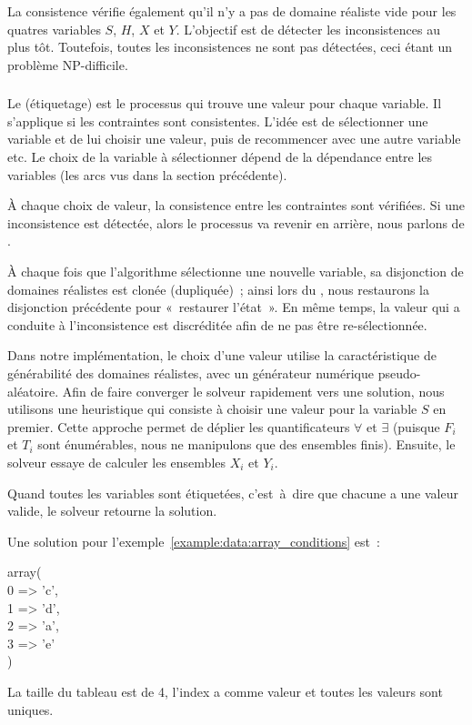 La consistence vérifie également qu'il n'y a pas de domaine réaliste vide pour
les quatres variables $S$, $H$, $X$ et $Y$. L'objectif est de détecter les
inconsistences au plus tôt. Toutefois, toutes les inconsistences ne sont pas
détectées, ceci étant un problème NP-difficile.

\subsubsection{}

Le  (étiquetage) est le processus qui trouve une valeur
pour chaque variable. Il s'applique si les contraintes sont consistentes. L'idée
est de sélectionner une variable et de lui choisir une valeur, puis de
recommencer avec une autre variable etc. Le choix de la variable à sélectionner
dépend de la dépendance entre les variables (les arcs vus dans la section
précédente).

À chaque choix de valeur, la consistence entre les contraintes sont
vérifiées. Si une inconsistence est détectée, alors le processus va revenir en
arrière, nous parlons de .

À chaque fois que l'algorithme sélectionne une nouvelle variable, sa disjonction
de domaines réalistes est clonée (dupliquée)~; ainsi lors du
, nous restaurons la disjonction précédente pour
«~restaurer l'état~». En même temps, la valeur qui a conduite à l'inconsistence
est discréditée afin de ne pas être re-sélectionnée.

Dans notre implémentation, le choix d'une valeur utilise la caractéristique de
générabilité des domaines réalistes, avec un générateur numérique
pseudo-aléatoire. Afin de faire converger le solveur rapidement vers une
solution, nous utilisons une heuristique qui consiste à choisir une valeur pour
la variable $S$ en premier.  Cette approche permet de déplier les
quantificateurs $\forall$ et $\exists$ (puisque $F_i$ et $T_i$ sont énumérables,
nous ne manipulons que des ensembles finis). Ensuite, le solveur essaye de
calculer les ensembles $X_i$ et $Y_i$.

Quand toutes les variables sont étiquetées, c'est~à~dire que chacune a une
valeur valide, le solveur retourne la solution.

\begin{example}

Une solution pour l'exemple~\ref{example:data:array_conditions} est~:
%
\begin{pre}
array( \\
    0 => 'c', \\
    1 => 'd', \\
    2 => 'a', \\
    3 => 'e' \\
)
\end{pre}
%
La taille du tableau est de 4, l'index  a comme valeur  et
toutes les valeurs sont uniques.

\end{example}
